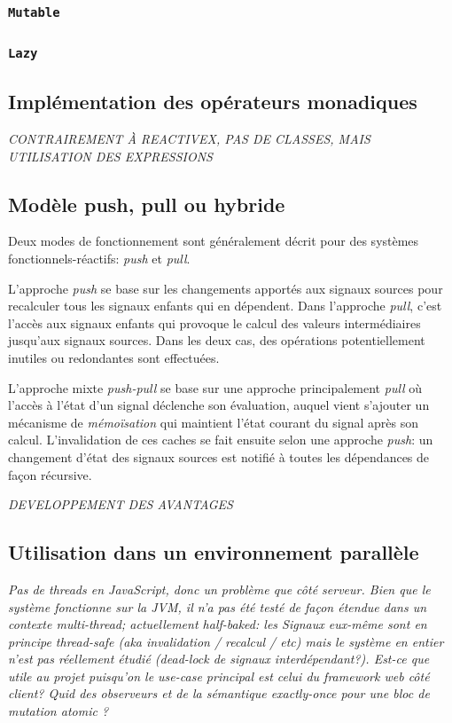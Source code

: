 \subsubsection{\texttt{Mutable}}

\subsubsection{\texttt{Lazy}}

\subsection{Implémentation des opérateurs monadiques}

\textit{CONTRAIREMENT À REACTIVEX, PAS DE CLASSES, MAIS UTILISATION DES EXPRESSIONS}

\subsection{Modèle push, pull ou hybride}

Deux modes de fonctionnement sont généralement décrit pour des systèmes fonctionnels-réactifs: \emph{push} et \emph{pull}.

L'approche \emph{push} se base sur les changements apportés aux signaux sources pour recalculer tous les signaux enfants qui en dépendent. Dans l'approche \emph{pull}, c'est l'accès aux signaux enfants qui provoque le calcul des valeurs intermédiaires jusqu'aux signaux sources. Dans les deux cas, des opérations potentiellement inutiles ou redondantes sont effectuées.

L'approche mixte \emph{push-pull} se base sur une approche principalement \emph{pull} où l'accès à l'état d'un signal déclenche son évaluation, auquel vient s'ajouter un mécanisme de \emph{mémoïsation} qui maintient l'état courant du signal après son calcul. L'invalidation de ces caches se fait ensuite selon une approche \emph{push}: un changement d'état des signaux sources est notifié à toutes les dépendances de façon récursive.

\textit{DEVELOPPEMENT DES AVANTAGES}

\subsection{Utilisation dans un environnement parallèle}

\textit{Pas de threads en JavaScript, donc un problème que côté serveur. Bien que le système fonctionne sur la JVM, il n'a pas été testé de façon étendue dans un contexte multi-thread; actuellement half-baked: les Signaux eux-même sont en principe thread-safe (aka invalidation / recalcul / etc) mais le système en entier n'est pas réellement étudié (dead-lock de signaux interdépendant?). Est-ce que utile au projet puisqu'on le use-case principal est celui du framework web côté client? Quid des observeurs et de la sémantique exactly-once pour une bloc de mutation atomic{} ?}